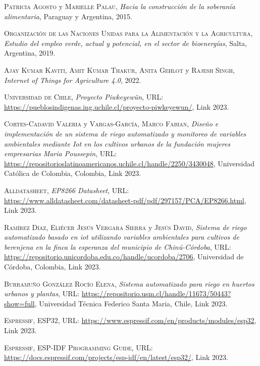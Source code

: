 \begin{thebibliography}{X}

 \textsc{Patricia Agosto} y \textsc{Marielle Palau},
\textit{Hacia la construcción de la soberanía alimentaria}, Paraguay y Argentina, 2015.

 \textsc{Organización de las Naciones Unidas para la Alimentación y la Agricultura}, \textit{Estudio del empleo verde, actual y potencial, en el sector de bioenergías}, Salta, Argentina, 2019.

 \textsc{Ajay Kumar Kaviti}, \textsc{Amit Kumar Thakur}, \textsc{Anita Gehlot} y \textsc{Rajesh Singh}, \textit{Internet of Things for Agriculture 4.0}, 2022.

 \textsc{Universidad de Chile},
\textit{Proyecto Piwkeyewün}, URL: \url{https://pueblosindigenas.ing.uchile.cl/proyecto-piwkeyewun/}, Link 2023.

 \textsc{Cortes-Cadavid Valeria} y \textsc{Vargas-García, Marco Fabian},
\textit{Diseño e implementación de un sistema de riego automatizado y monitoreo de variables ambientales mediante Iot en los cultivos urbanos de la fundación mujeres empresarias Maria Poussepin},  URL: \url{https://repositorioslatinoamericanos.uchile.cl/handle/2250/3430048}, Universidad Católica de Colombia, Colombia, Link 2023.

 \textsc{Alldatasheet}, \textit{EP8266 Datasheet},  URL: \url{https://www.alldatasheet.com/datasheet-pdf/pdf/297157/PCA/EP8266.html}, Link 2023.

 \textsc{Ramírez Díaz}, \textsc{Eliécer Jesús Vergara Sierra} y \textsc{Jesús David}, \textit{Sistema de riego automatizado basado en iot utilizando variables ambientales para cultivos de berenjena en la finca la esperanza del municipio de Chinú-Córdoba},  URL: \url{https://repositorio.unicordoba.edu.co/handle/ucordoba/2706}, Universidad de Córdoba, Colombia, Link 2023.

 \textsc{Burramuño González Rocío Elena},
\textit{Sistema automatizado para riego en huertos urbanos y plantas},  URL: \url{https://repositorio.usm.cl/handle/11673/50443?show=full}, Universidad Técnica Federico Santa Maria, Chile, Link 2023.

 \textsc{Espressif}, \textsc{ESP32},  URL: \url{https://www.espressif.com/en/products/modules/esp32}, Link 2023.

 \textsc{Espressif}, \textsc{ESP-IDF Programming Guide},  URL: \url{https://docs.espressif.com/projects/esp-idf/en/latest/esp32/}, Link 2023.


\end{thebibliography}
